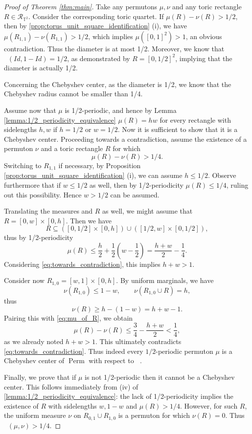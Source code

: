 \documentclass[10pt,a4paper]{amsart}
\newcommand{\Perm}{\mathop{\mathrm{Perm}}}
\newcommand{\ds}{\mathop{d_\square}}
\begin{document}
\begin{proof}[Proof of Theorem \ref{thm:main}]
    Take any permutons $\mu, \nu$ and any toric rectangle $R\in\mathcal{R}_{\mathbb{T}^2}$. Consider the corresponding toric quartet. If $\mu(R)-\nu(R)>1/2$, then by \cref{prop:torus_unit_square_identification} (i), we have $\mu(R_{1, 1})-\nu(R_{1, 1})>1/2$, which implies $\mu([0, 1]^2)>1$, an obvious contradiction. Thus the diameter is at most 1/2. Moreover, we know that $\ds(Id, 1-Id)=1/2$, as demonstrated by $R=[0, 1/2]^2$, implying that the diameter is actually 1/2.

    Concerning the Chebyshev center, as the diameter is 1/2, we know that the Chebyshev radius cannot be smaller than 1/4. 

    Assume now that $\mu$ is 1/2-periodic, and hence by Lemma \ref{lemma:1/2_periodicity_equivalence} $\mu(R)=hw$ for every rectangle with sidelengths $h, w$ if $h=1/2$ or $w=1/2$. Now it is sufficient to show that it is a Chebyshev center. Proceeding towards a contradiction, assume the existence of a permuton $\nu$ and a toric rectangle $R$ for which 
    \begin{equation}\label{eq:towards_contradiction}
    \mu(R)-\nu(R)>1/4.
    \end{equation}
    Switching to $R_{1, 1}$ if necessary, by Proposition \ref{prop:torus_unit_square_identification} (i), we can assume $h\leq 1/2$. Observe furthermore that if $w\leq 1/2$ as well, then by 1/2-periodicity $\mu(R)\leq 1/4$, ruling out this possibility. Hence $w>1/2$ can be assumed.

    Translating the measures and $R$ as well, we might assume that $R=[0, w]\times [0, h]$. Then we have
    $$R\subseteq \left([0, 1/2]\times [0, h]\right)\cup\left([1/2, w]\times [0, 1/2]\right),$$
    thus by 1/2-periodicity
    \begin{equation}\label{eq:mu_of_R}
    \mu(R)\leq \frac{h}{2}+\frac{1}{2}\left(w-\frac{1}{2}\right)=\frac{h+w}{2}-\frac{1}{4}.
    \end{equation}
    Considering \eqref{eq:towards_contradiction}, this implies $h+w> 1$.
    
    Consider now $R_{1, 0}=[w, 1]\times [0, h]$. By uniform marginals, we have
    $$\nu(R_{1, 0})\leq 1-w, \qquad \nu(R_{1, 0}\cup R)=h,$$
    thus
    $$\nu(R)\geq h-(1-w)=h+w-1.$$
    Pairing this with \eqref{eq:mu_of_R}, we obtain
    $$\mu(R)-\nu(R)\leq \frac{3}{4}-\frac{h+w}{2}<\frac{1}{4},$$
    as we already noted $h+w>1$. This ultimately contradicts \eqref{eq:towards_contradiction}. Thus indeed every $1/2$-periodic permuton $\mu$ is a Chebyshev center of $\Perm$ with respect to $\ds$.

    Finally, we prove that if $\mu$ is not 1/2-periodic then it cannot be a Chebyshev center. This follows immediately from (iv) of \cref{lemma:1/2_periodicity_equivalence}: the lack of 1/2-periodicity implies the existence of $R$ with sidelengths $w, 1-w$ and $\mu(R)>1/4$. However, for such $R$, the uniform measure $\nu$ on $R_{0, 1}\cup R_{1, 0}$ is a permuton for which $\nu(R)=0$. Thus $\ds(\mu, \nu)>1/4$.

\end{proof}
\end{document}
